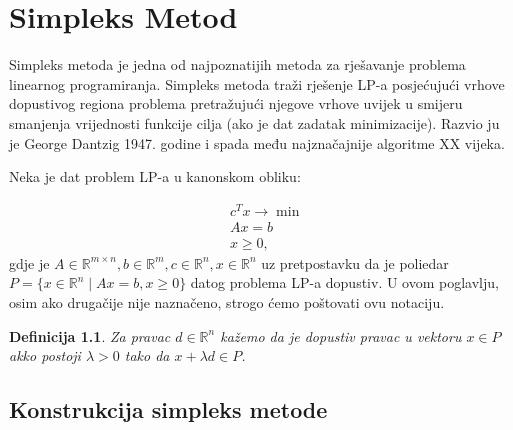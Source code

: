 \documentclass[a4paper, utf8, 11pt, colorlinks]{book}
\newtheorem{definition}{Definicija}
\begin{document}
\newpage 
\chapter{Simpleks Metod}

Simpleks metoda je jedna od najpoznatijih metoda za rješavanje problema linearnog programiranja. Simpleks metoda traži rješenje LP-a posjećujući vrhove dopustivog regiona problema pretražujući njegove vrhove uvijek u smijeru smanjenja vrijednosti funkcije cilja (ako je dat zadatak minimizacije). Razvio ju je George Dantzig 1947. godine i spada među najznačajnije algoritme XX vijeka.

Neka je dat problem LP-a u kanonskom obliku:

\begin{align}
    &c^Tx \rightarrow \min \nonumber \\ 
    & A x = b \nonumber \\
     & x \geq 0, \label{eq:lp_equality_constraint}
\end{align}
gdje je $A \in \mathbb{R}^{m \times n}, b \in \mathbb{R}^m, c \in \mathbb{R}^n, x\in \mathbb{R}^n$ uz pretpostavku da je poliedar $P=\{ x \in \mathbb{R}^n \mid A x = b , x \geq 0 \}$ datog problema LP-a dopustiv.  U ovom poglavlju, osim ako drugačije nije naznačeno, strogo ćemo poštovati ovu notaciju. 


\begin{definition}
      Za pravac $d\in \mathbb{R}^n$ kažemo da je dopustiv pravac u vektoru $x \in P$ akko postoji $\lambda > 0$ tako da $x + \lambda d \in P$.
\end{definition}

\section{Konstrukcija simpleks metode}
\end{document}
